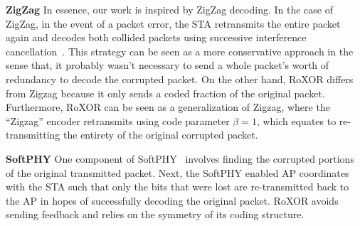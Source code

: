 \textbf{ZigZag} In essence, our work is inspired by ZigZag decoding. In the case of ZigZag, in the event of a packet error,  the STA retransmits the entire packet again and decodes both collided packets using successive interference cancellation~\cite{zigzag}. This strategy can be seen as a more conservative approach in the sense that, it probably wasn't necessary to send a whole packet's worth of redundancy to decode the corrupted packet. On the other hand, RoXOR differs from Zigzag because it only sends a coded fraction of the original packet. Furthermore, RoXOR can be seen as  a generalization of Zigzag, where the ``Zigzag'' encoder retransmits using code parameter $\beta=1$, which equates to re-transmitting the entirety of the original corrupted packet.

\textbf{SoftPHY} One component of SoftPHY~\cite{softphy} involves finding the corrupted portions of the original transmitted packet. Next, the SoftPHY enabled AP coordinates with the STA such that only the bits that were lost are re-transmitted back to the AP in hopes of successfully decoding the original packet. RoXOR avoids sending feedback and relies on the symmetry of its coding structure.
